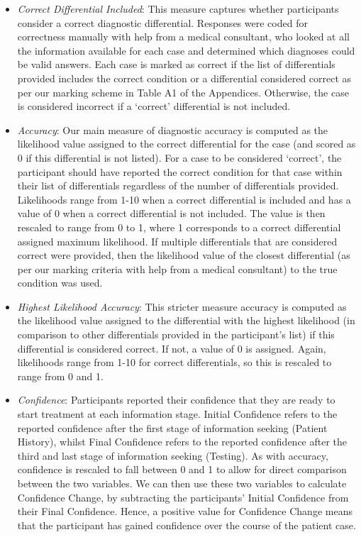 \documentclass[a4paper, nobind]{templates/ociamthesis}
\begin{document}
\begin{itemize}
\item
  \emph{Correct Differential Included}: This measure captures whether participants consider a correct diagnostic differential. Responses were coded for correctness manually with help from a medical consultant, who looked at all the information available for each case and determined which diagnoses could be valid answers. Each case is marked as correct if the list of differentials provided includes the correct condition or a differential considered correct as per our marking scheme in Table A1 of the Appendices. Otherwise, the case is considered incorrect if a `correct' differential is not included.
\item
  \emph{Accuracy}: Our main measure of diagnostic accuracy is computed as the likelihood value assigned to the correct differential for the case (and scored as 0 if this differential is not listed). For a case to be considered `correct', the participant should have reported the correct condition for that case within their list of differentials regardless of the number of differentials provided. Likelihoods range from 1-10 when a correct differential is included and has a value of 0 when a correct differential is not included. The value is then rescaled to range from 0 to 1, where 1 corresponds to a correct differential assigned maximum likelihood. If multiple differentials that are considered correct were provided, then the likelihood value of the closest differential (as per our marking criteria with help from a medical consultant) to the true condition was used.
\item
  \emph{Highest Likelihood Accuracy}: This stricter measure accuracy is computed as the likelihood value assigned to the differential with the highest likelihood (in comparison to other differentials provided in the participant's list) if this differential is considered correct. If not, a value of 0 is assigned. Again, likelihoods range from 1-10 for correct differentials, so this is rescaled to range from 0 and 1.
\item
  \emph{Confidence}: Participants reported their confidence that they are ready to start treatment at each information stage. Initial Confidence refers to the reported confidence after the first stage of information seeking (Patient History), whilst Final Confidence refers to the reported confidence after the third and last stage of information seeking (Testing). As with accuracy, confidence is rescaled to fall between 0 and 1 to allow for direct comparison between the two variables. We can then use these two variables to calculate Confidence Change, by subtracting the participants' Initial Confidence from their Final Confidence. Hence, a positive value for Confidence Change means that the participant has gained confidence over the course of the patient case.

\end{itemize}
\end{document}
